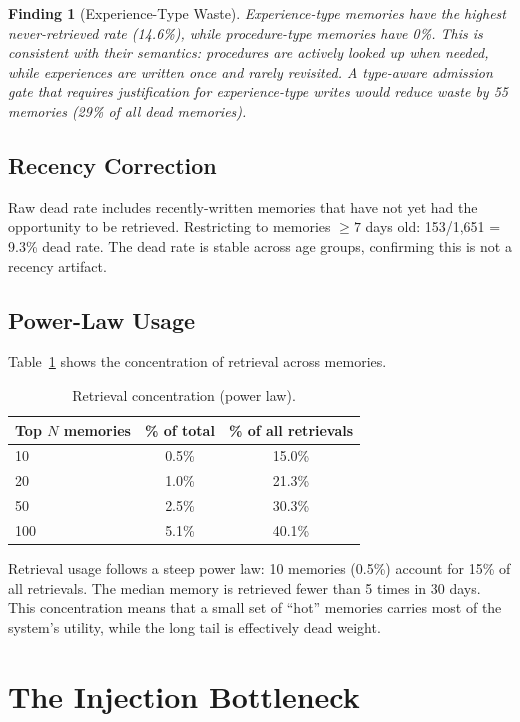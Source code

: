 \documentclass[11pt]{article}
\newtheorem{finding}{Finding}
\begin{document}
\begin{finding}[Experience-Type Waste]
Experience-type memories have the highest never-retrieved rate (14.6\%), while procedure-type memories have 0\%. This is consistent with their semantics: procedures are actively looked up when needed, while experiences are written once and rarely revisited. A type-aware admission gate that requires justification for experience-type writes would reduce waste by 55 memories (29\% of all dead memories).
\end{finding}

\subsection{Recency Correction}

Raw dead rate includes recently-written memories that have not yet had the opportunity to be retrieved. Restricting to memories $\geq 7$ days old: 153/1,651 = 9.3\% dead rate. The dead rate is stable across age groups, confirming this is not a recency artifact.

\subsection{Power-Law Usage}
\label{sec:powerlaw}

Table~\ref{tab:powerlaw} shows the concentration of retrieval across memories.

\begin{table}[h]
\centering
\caption{Retrieval concentration (power law).}
\label{tab:powerlaw}
\begin{tabular}{lcc}
\toprule
Top $N$ memories & \% of total & \% of all retrievals \\
\midrule
10 & 0.5\% & 15.0\% \\
20 & 1.0\% & 21.3\% \\
50 & 2.5\% & 30.3\% \\
100 & 5.1\% & 40.1\% \\
\bottomrule
\end{tabular}
\end{table}

Retrieval usage follows a steep power law: 10 memories (0.5\%) account for 15\% of all retrievals. The median memory is retrieved fewer than 5 times in 30 days. This concentration means that a small set of ``hot'' memories carries most of the system's utility, while the long tail is effectively dead weight.

\section{The Injection Bottleneck}
\label{sec:injection}
\end{document}
